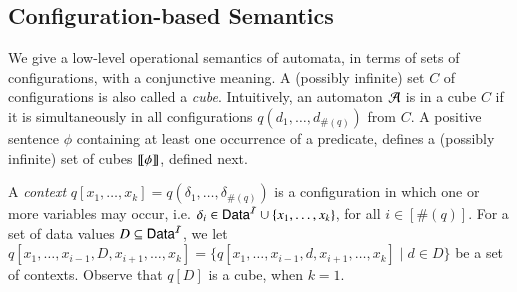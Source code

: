 \documentclass{llncs}
\begin{document}
\subsection{Configuration-based Semantics}

We give a low-level operational semantics of automata, in terms of
sets of configurations, with a conjunctive meaning. A (possibly
infinite) set $C$ of configurations is also called a
\emph{cube}. Intuitively, an automaton $\mathcal{A}$ is in a cube $C$ if it is
simultaneously in all configurations $q(d_1, \ldots, d_{\#(q)})$ from
$C$. A positive sentence $\phi$ containing at least one occurrence of
a predicate, defines a (possibly infinite) set of cubes ${\bf [\![} \phi {\bf ]\!]}$,
defined next.

A \emph{context} $q[x_1,\ldots,x_k] = q(\delta_1, \ldots,
\delta_{\#(q)})$ is a configuration in which one or more variables may
occur, i.e. $\delta_i \in \mathsf{Data}^{\mathcal{I}} \cup \{ x_1,\ldots,x_k \}$, for all
$i \in [\#(q)]$. For a set of data values $D \subseteq \mathsf{Data}^{\mathcal{I}}$, we
let $q[x_1,\ldots,x_{i-1},D,x_{i+1}, \ldots, x_k] =
\{q[x_1,\ldots,x_{i-1},d,x_{i+1},\ldots,x_k] \mid d \in D\}$ be a set
of contexts. Observe that $q[D]$ is a cube, when $k=1$.

 

\end{document}
